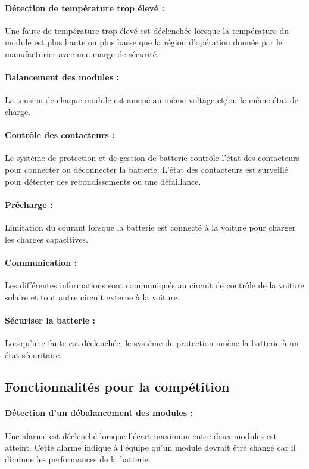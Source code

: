 		\paragraph{Détection de température trop élevé :}
		Une faute de température trop élevé est déclenchée lorsque la température du module est plus haute ou plus basse que la région d'opération donnée par le manufacturier avec une marge de sécurité.
					
		\paragraph{Balancement des modules :}
		La tension de chaque module est amené au même voltage et/ou le même état de charge.
		
		\paragraph{Contrôle des contacteurs :}
		Le système de protection et de gestion de batterie contrôle l'état des contacteurs pour connecter ou déconnecter la batterie. L'état des contacteurs est surveillé pour détecter des rebondissements ou une défaillance.
		
		\paragraph{Précharge :}
		Limitation du courant lorsque la batterie est connecté à la voiture pour charger les charges capacitives.
		
		\paragraph{Communication :}
		Les différentes informations sont communiqués au circuit de contrôle de la voiture solaire et tout autre circuit externe à la voiture.	
		
		\paragraph{Sécuriser la batterie :}
		Lorsqu'une faute est déclenchée, le système de protection amène la batterie à un état sécuritaire. 
			
	
	\subsection{Fonctionnalités pour la compétition}
		

			\paragraph{Détection d'un débalancement des modules :}
			Une alarme est déclenché lorsque l'écart maximum entre deux modules est atteint. Cette alarme indique à l'équipe qu'un module devrait être changé car il diminue les performances de la batterie.  
			
